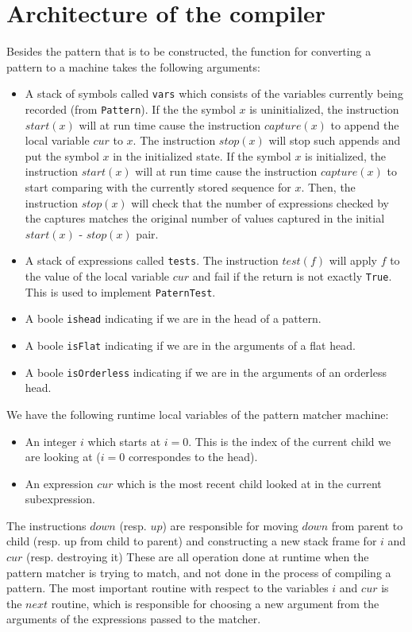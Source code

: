 \documentclass[12 pt]{amsart}
\begin{document}
\section{Architecture of the compiler}
Besides the pattern that is to be constructed, the function for converting a pattern to a machine takes the following arguments:
\begin{itemize}
\item A stack of symbols called {\tt vars} which consists of the variables currently being recorded (from {\tt Pattern}). If the the symbol $x$ is uninitialized, the instruction $start(x)$ will at run time cause the instruction $capture(x)$ to append the local variable $cur$ to $x$. The instruction $stop(x)$ will stop such appends and put the symbol $x$ in the initialized state. If the symbol $x$ is initialized, the instruction $start(x)$ will at run time cause the instruction $capture(x)$ to start comparing with the currently stored sequence for $x$. Then, the instruction $stop(x)$ will check that the number of expressions checked by the captures matches the original number of values captured in the initial $start(x)$ - $stop(x)$ pair.
\item A stack of expressions called {\tt tests}. The instruction $test(f)$ will apply $f$ to the value of the local variable $cur$ and fail if the return is not exactly {\tt True}. This is used to implement {\tt PaternTest}.
\item A boole {\tt ishead} indicating if we are in the head of a pattern.
\item A boole {\tt isFlat} indicating if we are in the arguments of a flat head.
\item A boole {\tt isOrderless} indicating if we are in the arguments of an orderless head.
\end{itemize}

We have the following runtime local variables of the pattern matcher machine:
\begin{itemize}
\item An integer $i$ which starts at $i=0$. This is the index of the current child we are looking at ($i=0$ correspondes to the head).
\item An expression $cur$ which is the most recent child looked at in the current subexpression.
\end{itemize}
The instructions $down$ (resp. $up$) are responsible for moving $down$ from parent to child (resp. up from child to parent) and constructing a new stack frame for $i$ and $cur$ (resp. destroying it) These are all operation done at runtime when the pattern matcher is trying to match, and not done in the process of compiling a pattern. The most important routine with respect to the variables $i$ and $cur$ is the $next$ routine, which is responsible for choosing a new argument from the arguments of the expressions passed to the matcher.
\end{document}
